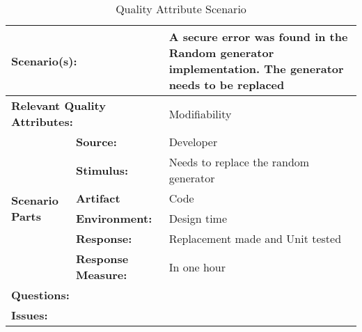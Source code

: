 \begin{table}[H]
\begin{center}
\begin{tabular}{|p{0.3cm}|p{2.5cm}|p{8cm}|}
  \hline
  \multicolumn{2}{|p{3cm}|}{\bfseries Scenario(s):} & A secure error was found in the Random generator implementation. The generator needs to be replaced \\
  \hline
  \multicolumn{2}{|p{3cm}|}{\bfseries Relevant Quality Attributes:} & Modifiability\\
  \hline
  \multirow{6}{*}{\begin{sideways}{\bfseries Scenario Parts}\end{sideways}}
  & {\bfseries Source:} & Developer \\
  \cline{2-3}
  & {\bfseries Stimulus:} & Needs to replace the random generator \\
  \cline{2-3}
  & {\bfseries Artifact} &  Code \\
  \cline{2-3}
  & {\bfseries Environment:} &  Design time \\
  \cline{2-3}
  & {\bfseries Response:} &  Replacement made and Unit tested\\
  \cline{2-3}
  & {\bfseries Response Measure:} & In one hour\\
  \hline
  \multicolumn{2}{|p{3cm}|}{\bfseries Questions:} &  \\
  \hline
  \multicolumn{2}{|p{3cm}|}{\bfseries Issues:} &  \\
  \hline
\end{tabular}
\caption{Quality Attribute Scenario}
\end{center}
\end{table}

